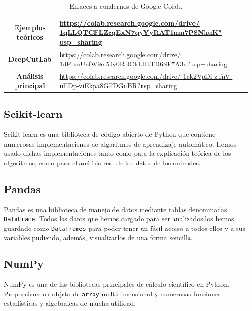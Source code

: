 \begin{table}[h]
    \centering
    \begin{tabular}{|c|p{10cm}|}
        \hline
        \textbf{Ejemplos teóricos} & \href{https://colab.research.google.com/drive/
        1qLLQTCFLZcqExN7qyYyRAT1nm7P8NhuK?usp=sharing}{https://colab.research.google.com/drive/ 1qLLQTCFLZcqExN7qyYyRAT1nm7P8NhuK?usp=sharing} \\
        \hline
        \textbf{DeepCutLab} & \href{https://colab.research.google.com/drive/1dFbmUcfW9el50v0RBCkLIItTD6SF7A3x?usp=sharing}{https://colab.research.google.com/drive/
        1dFbmUcfW9el50v0RBCkLIItTD6SF7A3x?usp=sharing} \\
        \hline
        \textbf{Análisis principal} & \href{https://colab.research.google.com/drive/
        1ak2VpDi-zTnV-uEDp-viEkpa8GFDGuBR?usp=sharing}{https://colab.research.google.com/drive/ 1ak2VpDi-zTnV-uEDp-viEkpa8GFDGuBR?usp=sharing} \\
        \hline
    \end{tabular}
    \caption{Enlaces a cuadernos de Google Colab.}
    \label{tab:colab-links}
\end{table}

\newpage
\subsection*{Scikit-learn}
Scikit-learn \cite{scikit-learn} es una biblioteca de código abierto de Python que contiene numerosas implementaciones de algoritmos de aprendizaje automático. Hemos usado dichas implementaciones tanto como para la explicación teórica de los algoritmos, como para el análisis real de los datos de los animales.

\subsection*{Pandas}
Pandas es una biblioteca de manejo de datos mediante tablas denominadas \texttt{DataFrame}. Todos los datos que hemos cargado para ser analizados los hemos guardado como \texttt{DataFrames} para poder tener un fácil acceso a todos ellos y a sus variables pudiendo, además, visualizarlos de una forma sencilla.

\subsection*{NumPy}
NumPy es una de las bibliotecas principales de cálculo científico en Python. Proporciona un objeto de \texttt{array} multidimensional y numerosas funciones estadísticas y algebraicas de mucha utilidad.

